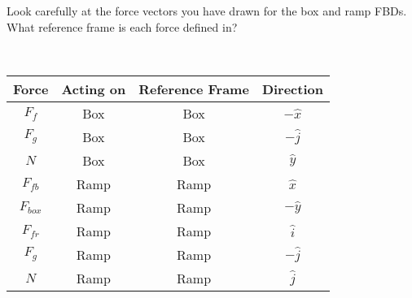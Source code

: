 Look carefully at the force vectors you have drawn for the box and ramp FBDs. What reference frame is each force defined in?

\begin{solution}\
\begin{center}
    \begin{tabular}{ |c|c|c|c| }
    \hline
    Force & Acting on & Reference Frame & Direction \\
    \hline
    $F_f$ & Box & Box & $-\hat{x}$ \\
    $F_g$ & Box & Box & $-\hat{j}$ \\
    $N$ & Box & Box & $\hat{y}$ \\
    $F_{fb}$ & Ramp & Ramp & $\hat{x}$ \\
    $F_{box}$ & Ramp & Ramp & $-\hat{y}$ \\
    $F_{fr}$ & Ramp & Ramp & $\hat{i}$ \\
    $F_g$ & Ramp & Ramp & $-\hat{j}$ \\
    $N$ & Ramp & Ramp & $\hat{j}$ \\
    \hline
    \end{tabular}
\end{center}
\end{solution}